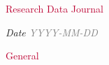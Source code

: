 \documentclass[12pt]{article}
\begin{document}

{\fontsize{18pt}{21.6pt}\selectfont \textcolor[HTML]{BC0031}{Research Data Journal}\par}\par
{\fontsize{14pt}{16.8pt}\selectfont \textit{Date \textcolor[HTML]{808080}{YYYY-MM-DD}}\par}\par %



{\fontsize{14pt}{16.8pt}\selectfont \textcolor[HTML]{BC0031}{General}\par}\par
\end{document}
